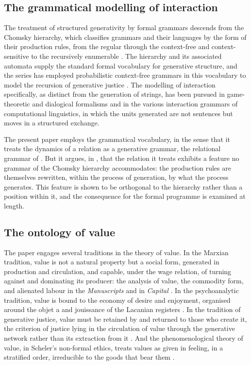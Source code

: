 \subsection{The grammatical modelling of interaction}
\label{p10:sec:bg-grammar}

The treatment of structured generativity by formal grammars descends from the Chomsky hierarchy, which classifies grammars and their languages by the form of their production rules, from the regular through the context-free and context-sensitive to the recursively enumerable \parencite{chomsky1965,hopcroft2006}. The hierarchy and its associated automata supply the standard formal vocabulary for generative structure, and the series has employed probabilistic context-free grammars in this vocabulary to model the recursion of generative justice \parencite{eglash2016,eglash1999}. The modelling of interaction specifically, as distinct from the generation of strings, has been pursued in game-theoretic and dialogical formalisms and in the various interaction grammars of computational linguistics, in which the units generated are not sentences but moves in a structured exchange.

The present paper employs the grammatical vocabulary, in the sense that it treats the dynamics of a relation as a generative grammar, the relational grammar of . But it argues, in , that the relation it treats exhibits a feature no grammar of the Chomsky hierarchy accommodates: the production rules are themselves rewritten, within the process of generation, by what the process generates. This feature is shown to be orthogonal to the hierarchy rather than a position within it, and the consequence for the formal programme is examined at length.

\subsection{The ontology of value}
\label{p10:sec:bg-value}

The paper engages several traditions in the theory of value. In the Marxian tradition, value is not a natural property but a social form, generated in production and circulation, and capable, under the wage relation, of turning against and dominating its producer: the analysis of value, the commodity form, and alienated labour in the \emph{Manuscripts} and in \emph{Capital} \parencite{marx1959,marx1976,marx1973}. In the psychoanalytic tradition, value is bound to the economy of desire and enjoyment, organised around the objet a and jouissance of the Lacanian registers \parencite{lacan1992,lacan1978sem11,lacan1998,fink1995,evans1996}. In the tradition of generative justice, value must be retained by and returned to those who create it, the criterion of justice lying in the circulation of value through the generative network rather than its extraction from it \parencite{eglash2016}. And the phenomenological theory of value, in Scheler's non-formal ethics, treats values as given in feeling, in a stratified order, irreducible to the goods that bear them \parencite{scheler1973}.

